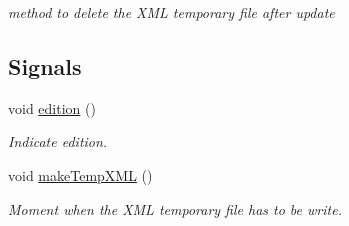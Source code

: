 \begin{DoxyCompactItemize}
\begin{DoxyCompactList}\small\item\em method to delete the X\+M\+L temporary file after update \end{DoxyCompactList}\end{DoxyCompactItemize}
\subsection*{Signals}
\begin{DoxyCompactItemize}
\item 
\hypertarget{classArea_a1e7dcab3e158c58d22d4f5096336b784}{void \hyperlink{classArea_a1e7dcab3e158c58d22d4f5096336b784}{edition} ()}\label{classArea_a1e7dcab3e158c58d22d4f5096336b784}

\begin{DoxyCompactList}\small\item\em Indicate edition. \end{DoxyCompactList}\item 
\hypertarget{classArea_af1d326edb69ae3b42235b93ed664c691}{void \hyperlink{classArea_af1d326edb69ae3b42235b93ed664c691}{make\+Temp\+X\+M\+L} ()}\label{classArea_af1d326edb69ae3b42235b93ed664c691}

\begin{DoxyCompactList}\small\item\em Moment when the X\+M\+L temporary file has to be write. \end{DoxyCompactList}\end{DoxyCompactItemize}
